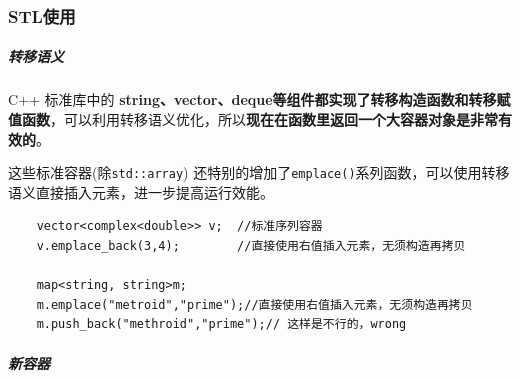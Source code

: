 \documentclass[UTF8,a4paper,12pt]{ctexbook} %
\begin{document}
			\subsubsection{STL使用}
				\subparagraph{转移语义}
					C++ 标准库中的 \textbf{string、vector、deque等组件都实现了转移构造函数和转移赋值函数}，可以利用转移语义优化，所以\textbf{现在在函数里返回一个大容器对象是非常有效的}。
					
					这些标准容器(除\verb|std::array|) 还特别的增加了\verb|emplace()|系列函数，可以使用转移语义直接插入元素，进一步提高运行效能。
			\begin{lstlisting}
	vector<complex<double>> v;	//标准序列容器
	v.emplace_back(3,4);        //直接使用右值插入元素，无须构造再拷贝

	map<string, string>m;
	m.emplace("metroid","prime");//直接使用右值插入元素，无须构造再拷贝
	m.push_back("methroid","prime");// 这样是不行的，wrong			
			\end{lstlisting}
				\subparagraph{新容器}
\end{document}
